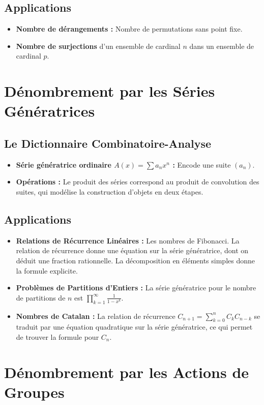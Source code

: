 \documentclass[12pt, a4paper, parskip=full]{report}
\theoremstyle{agregstyle}
\begin{document}
\subsection{Applications}
\begin{itemize}
    \item \textbf{Nombre de dérangements :} Nombre de permutations sans point fixe.
    \item \textbf{Nombre de surjections} d'un ensemble de cardinal $n$ dans un ensemble de cardinal $p$.
\end{itemize}

\section{Dénombrement par les Séries Génératrices}
\subsection{Le Dictionnaire Combinatoire-Analyse}
\begin{itemize}
    \item \textbf{Série génératrice ordinaire $A(x) = \sum a_n x^n$ :} Encode une suite $(a_n)$.
    \item \textbf{Opérations :} Le produit des séries correspond au produit de convolution des suites, qui modélise la construction d'objets en deux étapes.
\end{itemize}
\subsection{Applications}
\begin{itemize}
    \item \textbf{Relations de Récurrence Linéaires :} Les nombres de Fibonacci. La relation de récurrence donne une équation sur la série génératrice, dont on déduit une fraction rationnelle. La décomposition en éléments simples donne la formule explicite.
    \item \textbf{Problèmes de Partitions d'Entiers :} La série génératrice pour le nombre de partitions de $n$ est $\prod_{k=1}^\infty \frac{1}{1-x^k}$.
    \item \textbf{Nombres de Catalan :} La relation de récurrence $C_{n+1} = \sum_{k=0}^n C_k C_{n-k}$ se traduit par une équation quadratique sur la série génératrice, ce qui permet de trouver la formule pour $C_n$.
\end{itemize}

\section{Dénombrement par les Actions de Groupes}
\end{document}
